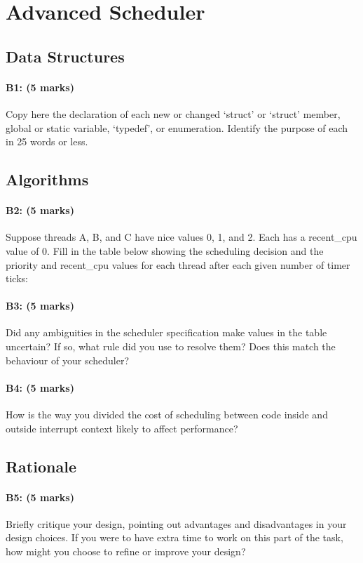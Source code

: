 \section{Advanced Scheduler}
\subsection{Data Structures}
\paragraph{B1: (5 marks)}
Copy here the declaration of each new or changed `struct' or `struct' member, global or static variable, `typedef', or enumeration.  Identify the purpose of each in 25 words or less.

\subsection{Algorithms}
\paragraph{B2: (5 marks)}
Suppose threads A, B, and C have nice values 0, 1, and 2.  Each has a recent\_cpu value of 0.  Fill in the table below showing the scheduling decision and the priority and recent\_cpu values for each thread after each given number of timer ticks:

\paragraph{B3: (5 marks)}
Did any ambiguities in the scheduler specification make values
in the table uncertain?  If so, what rule did you use to resolve
them?  Does this match the behaviour of your scheduler?

\paragraph{B4: (5 marks)}
How is the way you divided the cost of scheduling between code inside and outside interrupt context likely to affect performance?

\subsection{Rationale}
\paragraph{B5: (5 marks)}
Briefly critique your design, pointing out advantages and disadvantages in your design choices.  If you were to have extra time to work on this part of the task, how might you choose to refine or improve your design?

